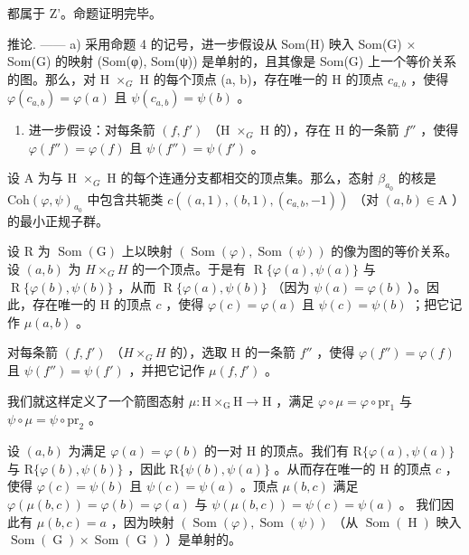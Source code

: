 都属于 Z'。命题证明完毕。

推论. —— a) 采用命题 4 的记号，进一步假设从 Som(H) 映入 Som(G) × Som(G) 的映射 (Som(φ), Som(ψ)) 是单射的，且其像是 Som(G) 上一个等价关系的图。那么，对 H \(\times_{G}\) H 的每个顶点 (a, b)，存在唯一的 H 的顶点 \(c_{a,b}\) ，使得 \(\varphi(c_{a,b}) = \varphi(a)\) 且 \(\psi(c_{a,b}) = \psi(b)\) 。

\begin{enumerate}
\def\labelenumi{\alph{enumi})}
\setcounter{enumi}{1}
\tightlist
\item
  进一步假设：对每条箭 \((f, f')\) （H \(\times_{G}\) H 的），存在 H 的一条箭 \(f''\) ，使得 \(\varphi(f'') = \varphi(f)\) 且 \(\psi(f'') = \psi(f')\) 。
\end{enumerate}

设 A 为与 H \(\times_{G}\) H 的每个连通分支都相交的顶点集。那么，态射 \(\beta_{a_{0}}\) 的核是 \(\mathrm{Coh}(\varphi,\psi)_{a_{0}}\) 中包含共轭类 \(c((a,1),(b,1),(c_{a,b},-1))\) （对 \((a,b)\in\mathrm{A}\) ）的最小正规子群。

设 R 为 \(\operatorname{Som}(\mathrm{G})\) 上以映射 \((\operatorname{Som}(\varphi),\operatorname{Som}(\psi))\) 的像为图的等价关系。设 \((a,b)\) 为 \(H\times_{G}H\) 的一个顶点。于是有 \(\operatorname{R}\{\varphi(a),\psi(a)\}\) 与 \(\operatorname{R}\{\varphi(b),\psi(b)\}\) ，从而 \(\operatorname{R}\{\varphi(a),\psi(b)\}\) （因为 \(\psi(a)=\varphi(b)\) ）。因此，存在唯一的 H 的顶点 \(c\) ，使得 \(\varphi(c)=\varphi(a)\) 且 \(\psi(c)=\psi(b)\) ；把它记作 \(\mu(a,b)\) 。

对每条箭 \((f, f')\) （\(H\times_{G}H\) 的），选取 H 的一条箭 \(f''\) ，使得 \(\varphi(f'') = \varphi(f)\) 且 \(\psi(f'') = \psi(f')\) ，并把它记作 \(\mu(f, f')\) 。

我们就这样定义了一个箭图态射 \(\mu\colon\mathrm{H}\times_{\mathrm{G}}\mathrm{H}\to\mathrm{H}\) ，满足 \(\varphi\circ\mu=\varphi\circ\mathrm{pr}_{1}\) 与 \(\psi\circ\mu=\psi\circ\mathrm{pr}_{2}\) 。

设 \((a,b)\) 为满足 \(\varphi(a)=\varphi(b)\) 的一对 H 的顶点。我们有 \(\mathrm{R}\{\varphi(a),\psi(a)\}\) 与 \(\mathrm{R}\{\varphi(b),\psi(b)\}\) ，因此 \(\mathrm{R}\{\psi(b),\psi(a)\}\) 。从而存在唯一的 H 的顶点 \(c\) ，使得 \(\varphi(c)=\psi(b)\) 且 \(\psi(c)=\psi(a)\) 。顶点 \(\mu(b,c)\) 满足 \(\varphi(\mu(b,c))=\varphi(b)=\varphi(a)\) 与 \(\psi(\mu(b,c))=\psi(c)=\psi(a)\) 。 我们因此有 \(\mu(b,c)=a\) ，因为映射 \((\operatorname{Som}(\varphi),\operatorname{Som}(\psi))\) （从 \(\operatorname{Som}(\operatorname{H})\) 映入 \(\operatorname{Som}(\operatorname{G})\times\operatorname{Som}(\operatorname{G})\) ）是单射的。

